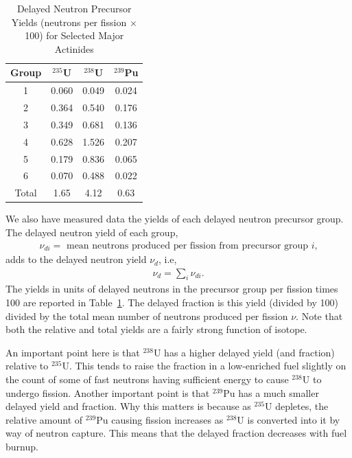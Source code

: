\begin{table}[tb!]
\caption{Delayed Neutron Precursor Yields (neutrons per fission $\times$ 100) for Selected Major Actinides}
\begin{center}
\begin{tabular}{|c|c|c|c|} \hline
  Group	& $^{235}$U			& $^{238}$U			& $^{239}$Pu		\\ \hline
  1		& 0.060				& 0.049				& 0.024				\\
  2		& 0.364				& 0.540				& 0.176				\\
  3		& 0.349				& 0.681				& 0.136				\\
  4		& 0.628				& 1.526				& 0.207				\\
  5		& 0.179				& 0.836				& 0.065				\\
  6		& 0.070				& 0.488				& 0.022				\\ \hline 
  Total & 1.65				& 4.12				& 0.63				\\ \hline
\end{tabular}
\end{center}
\label{Table:kinetics_delayedPrecursorYields}
\end{table}%

We also have measured data the yields of each delayed neutron precursor group. The delayed neutron yield of each group,
\begin{align}
  \nu_{di} = \text{ mean neutrons produced per fission from precursor group $i$,} \nonumber
\end{align}
adds to the delayed neutron yield $\nu_d$, i.e,
\begin{align}
  \nu_d = \sum_i \nu_{di} .
\end{align}
The yields in units of delayed neutrons in the precursor group per fission times 100 are reported in Table~\ref{Table:kinetics_delayedPrecursorYields}. The delayed fraction is this yield (divided by 100) divided by the total mean number of neutrons produced per fission $\nu$. Note that both the relative and total yields are a fairly strong function of isotope. 

An important point here is that $^{238}$U has a higher delayed yield (and fraction) relative to $^{235}$U. This tends to raise the fraction in a low-enriched fuel slightly on the count of some of fast neutrons having sufficient energy to cause $^{238}$U to undergo fission. Another important point is that $^{239}$Pu has a much smaller delayed yield and fraction. Why this matters is because as $^{235}$U depletes, the relative amount of $^{239}$Pu causing fission increases as $^{238}$U is converted into it by way of neutron capture. This means that the delayed fraction decreases with fuel burnup.

